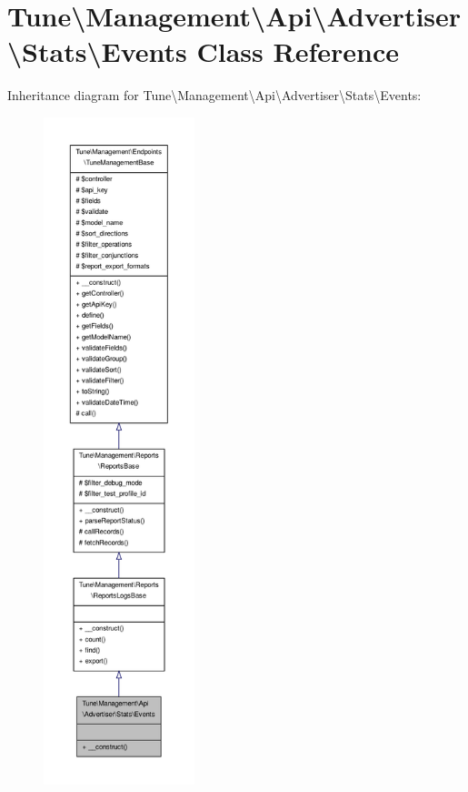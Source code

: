 \hypertarget{classTune_1_1Management_1_1Api_1_1Advertiser_1_1Stats_1_1Events}{\section{Tune\textbackslash{}Management\textbackslash{}Api\textbackslash{}Advertiser\textbackslash{}Stats\textbackslash{}Events Class Reference}
\label{classTune_1_1Management_1_1Api_1_1Advertiser_1_1Stats_1_1Events}
}


Inheritance diagram for Tune\textbackslash{}Management\textbackslash{}Api\textbackslash{}Advertiser\textbackslash{}Stats\textbackslash{}Events\-:
\nopagebreak
\begin{figure}[H]
\begin{center}
\leavevmode
\includegraphics[height=550pt]{classTune_1_1Management_1_1Api_1_1Advertiser_1_1Stats_1_1Events__inherit__graph}
\end{center}
\end{figure}


